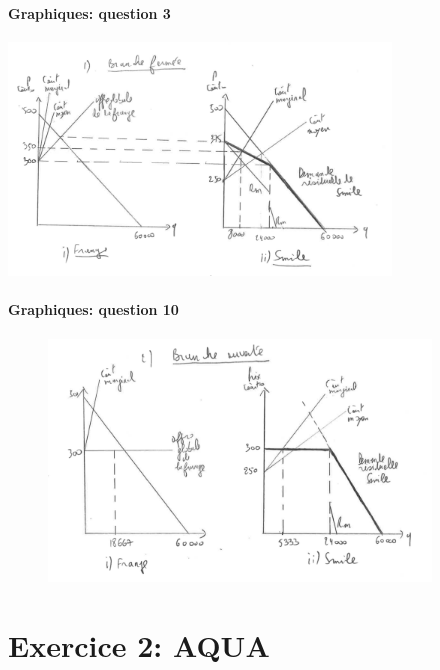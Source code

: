   \begin{frame}[allowframebreaks]{\insertsection}
   \framesubtitle{Graphiques: question 3}
   \begin{center}
   \includegraphics[width=4in]{figq3.png}
   \end{center}
   \end{frame}
   
   \begin{frame}[allowframebreaks]{\insertsection}
   \framesubtitle{Graphiques:  question 10}
   \begin{figure}
   \begin{center}
   \includegraphics[width=4in]{figq10.png}
   \end{center}
   \end{figure}
   \end{frame}
   
 \section{Exercice 2:  AQUA}
 \frame{\sectionpage}
 
